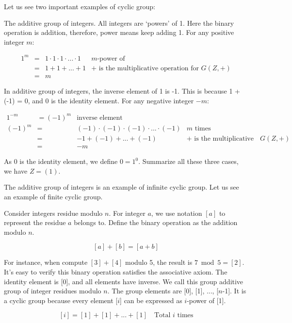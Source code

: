 \documentclass[b5paper]{article}
\begin{document}
Let us see two important examples of cyclic group:

\begin{example}
The additive group of integers. All integers are `powers' of 1. Here the binary operation is addition, therefore, power means keep adding 1. For any positive integer $m$:

\[
\begin{array}{rcll}
1^m & = & 1 \cdot 1 \cdot 1 \cdot ... \cdot 1 & \text{$m$-power of} \\
    & = & 1 + 1 + ... + 1 & \text{+ is the multiplicative operation for $G(Z, +)$} \\
    & = & m &
\end{array}
\]

In additive group of integers, the inverse element of 1 is -1. This is because 1 + (-1) = 0, and 0 is the identity element. For any negative integer $-m$:

\[
\begin{array}{rcll}
1^{-m} & = (-1)^m & \text{inverse element} & \\
(-1)^m & = & (-1) \cdot (-1) \cdot (-1) \cdot ... \cdot (-1) & \text{$m$ times} \\
       & = & -1 + (-1) + ... + (-1) & \text{+ is the multiplicative operation for $G(Z, +)$} \\
       & = & -m &
\end{array}
\]

As 0 is the identity element, we define $0 = 1^0$. Summarize all these three cases, we have $Z = (1)$.
\end{example}

The additive group of integers is an example of infinite cyclic group. Let us see an example of finite cyclic group.

\begin{example}
Consider integers residue modulo $n$. For integer $a$, we use notation $[a]$ to represent the residue $a$ belongs to. Define the binary operation as the addition modulo $n$.

\[
[a] + [b] = [a + b]
\]

For instance, when compute $[3] + [4]$ modulo 5, the result is $7 \bmod 5 = [2]$. It's easy to verify this binary operation satisfies the associative axiom. The identity element is [0], and all elements have inverse. We call this group additive group of integer residues modulo $n$. The group elements are [0], [1], ..., [$n$-1]. It is a cyclic group because every element [$i$] can be expressed as $i$-power of [1].

\[
[i] = [1] + [1] + ... + [1] \quad \text{Total $i$ times}
\]
\end{example}
\end{document}

